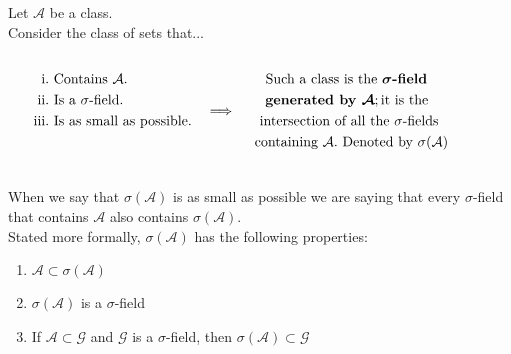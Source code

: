 	      		Let $\mathcal{A}$ be a class.\\[5pt]
	      		Consider the class of sets that...
	      		\vspace{-4.5ex}
	      		\[
	      			\hspace{-1cm}
	      			\begin{split}
	      				\begin{aligned}
	      					\text{i.}   & \text{ Contains } \mathcal{A}.      \\
	      					\text{ii.}  & \text{ Is a } \sigma \text{-field.} \\
	      					\text{iii.} & \text{ Is as small as possible.}    \\ \\
	      				\end{aligned}
	      			\end{split}
	      			\quad \Longrightarrow \quad
	      			\begin{split}
	      				\begin{gathered}\\ 
	      					\text{Such a class is the }\boldsymbol{\sigma}\textbf{-field }\\
	      					\textbf{generated by } \boldsymbol{\mathcal{A}}; \text{it is the } \\
	      					\text{intersection of all }\text{the } \sigma \text{-fields}\\
	      					  \text{ containing } \mathcal{A}. \text{ Denoted by } \sigma(\mathcal{A})\\
	      					\\
	      				\end{gathered}
	      			\end{split}
	      		\]
	      		
	      		\vspace{-2.5ex}
	      		
	      		When we say that $\sigma(\mathcal{A})$ is as small as possible we are saying that every $\sigma$-field that contains $\mathcal{A}$ also contains $\sigma(\mathcal{A})$.\\[5pt]

                Stated more formally, $\sigma(\mathcal{A})$ has the following properties:
	      		\vspace{2ex}
	      		\begin{enumerate}[label=\textbf{\roman*.}, topsep=0pt, itemsep=-3pt]
	      			\item $\mathcal{A} \subset \sigma(\mathcal{A})$
	      			\item $\sigma(\mathcal{A})$ is a $\sigma$-field
	      			\item If $\mathcal{A} \subset \mathcal{G} $ and $\mathcal{G}$ is a $\sigma$-field, then $\sigma(\mathcal{A}) \subset \mathcal{G}$
	      		\end{enumerate}
	      		
